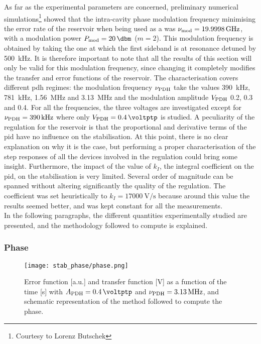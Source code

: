 As far as the experimental parameters are concerned, preliminary numerical simulations\footnote{Courtesy to Lorenz Butschek} showed that the intra-cavity phase modulation frequency minimising the error rate of the reservoir when being used as a \rcer was $\nu_{\text{mod}} = \SI{19.9998}{\giga\hertz}$, with a modulation power $\tind{P}{mod} = \SI{20}{\dbm}$ ($m=2$). This modulation frequency is obtained by taking the one at which the first sideband is at resonance detuned by \SI{500}{\kilo\hertz}. It is therefore important to note that all the results of this section will only be valid for this modulation frequency, since changing it completely modifies the transfer and error functions of the reservoir. The characterisation covers different \gls{pdh} regimes: the modulation frequency $\nu_{\text{PDH}}$ take the values \SI{390}{\kilo\hertz}, \SI{781}{\kilo\hertz}, \SI{1.56}{\mega\hertz} and \SI{3.13}{\mega\hertz} and the modulation amplitude $V_{\text{PDH}}$ \SI{0.2}{\voltptp}, \SI{0.3}{\voltptp} and \SI{0.4}{\voltptp}. For all the frequencies, the three voltages are investigated except for $\nu_{\text{PDH}} = \SI{390}{\kilo\hertz}$ where only $\tind{V}{PDH} = \SI{0.4}{\voltptp}$ is studied. A peculiarity of the regulation for the reservoir is that the proportional and derivative terms of the \gls{pid} have no influence on the stabilisation. At this point, there is no clear explanation on why it is the case, but performing a proper characterisation of the step responses of all the devices involved in the regulation could bring some insight. Furthermore, the impact of the value of $k_I$, the integral coefficient on the \gls{pid}, on the stabilisation is very limited. Several order of magnitude can be spanned without altering significantly the quality of the regulation. The coefficient was set heuristically to $k_I=\SI{17000}{\volt\per\second}$ because around this value the results seemed better, and was kept constant for all the measurements.\\

In the following paragraphs, the different quantities experimentally studied are presented, and the methodology followed to compute is explained.


\subsubsection{Phase}

\begin{figure}
	\centering
	\texttt{[image: stab\_phase/phase.png]}
	\caption{Error function [a.u.] and transfer function [\si{\volt}] as a function of the time [\si{\second}] with $\tind{A}{PDH} = \SI{0.4}{\voltptp}$ and $\nu_{\text{PDH}} = \SI{3.13}{\mega\hertz}$, and schematic representation of the method followed to compute the phase.}
	\label{phase}
\end{figure}

